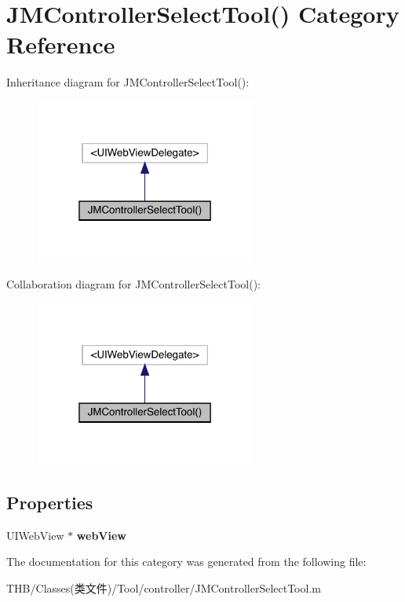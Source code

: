 \hypertarget{category_j_m_controller_select_tool_07_08}{}\section{J\+M\+Controller\+Select\+Tool() Category Reference}
\label{category_j_m_controller_select_tool_07_08}


Inheritance diagram for J\+M\+Controller\+Select\+Tool()\+:\nopagebreak
\begin{figure}[H]
\begin{center}
\leavevmode
\includegraphics[width=205pt]{category_j_m_controller_select_tool_07_08__inherit__graph}
\end{center}
\end{figure}


Collaboration diagram for J\+M\+Controller\+Select\+Tool()\+:\nopagebreak
\begin{figure}[H]
\begin{center}
\leavevmode
\includegraphics[width=205pt]{category_j_m_controller_select_tool_07_08__coll__graph}
\end{center}
\end{figure}
\subsection*{Properties}
\begin{DoxyCompactItemize}
\item 
\mbox{\label{category_j_m_controller_select_tool_07_08_a0f65f69ac2e55b4baf0e02e542d8d6b1}} 
U\+I\+Web\+View $\ast$ {\bfseries web\+View}
\end{DoxyCompactItemize}


The documentation for this category was generated from the following file\+:\begin{DoxyCompactItemize}
\item 
T\+H\+B/\+Classes(类文件)/\+Tool/controller/J\+M\+Controller\+Select\+Tool.\+m\end{DoxyCompactItemize}
